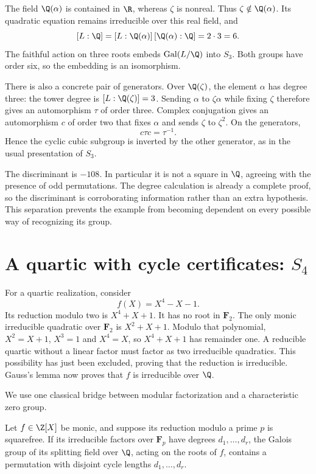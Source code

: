 The field $\Q(\alpha)$ is contained in $\R$, whereas $\zeta$ is nonreal. Thus $\zeta\notin\Q(\alpha)$. Its quadratic equation remains irreducible over this real field, and
\begin{equation}
\label{eq:g02-s3-degree}
[L:\Q]=[L:\Q(\alpha)]\,[\Q(\alpha):\Q]=2\cdot3=6.
\end{equation}
The faithful action on three roots embeds $\Gal(L/\Q)$ into $S_3$. Both groups have order six, so the embedding is an isomorphism.

There is also a concrete pair of generators. Over $\Q(\zeta)$, the element $\alpha$ has degree three: the tower degree is $[L:\Q(\zeta)]=3$. Sending $\alpha$ to $\zeta\alpha$ while fixing $\zeta$ therefore gives an automorphism $\tau$ of order three. Complex conjugation gives an automorphism $c$ of order two that fixes $\alpha$ and sends $\zeta$ to $\zeta^2$. On the generators,
\[
c\tau c=\tau^{-1}.
\]
Hence the cyclic cubic subgroup is inverted by the other generator, as in the usual presentation of $S_3$.

The discriminant is $-108$. In particular it is not a square in $\Q$, agreeing with the presence of odd permutations. The degree calculation is already a complete proof, so the discriminant is corroborating information rather than an extra hypothesis. This separation prevents the example from becoming dependent on every possible way of recognizing its group.

\section{A quartic with cycle certificates: $S_4$}

For a quartic realization, consider
\[
f(X)=X^4-X-1.
\]
Its reduction modulo two is $X^4+X+1$. It has no root in $\mathbf F_2$. The only monic irreducible quadratic over $\mathbf F_2$ is $X^2+X+1$. Modulo that polynomial, $X^2=X+1$, $X^3=1$ and $X^4=X$, so $X^4+X+1$ has remainder one. A reducible quartic without a linear factor must factor as two irreducible quadratics. This possibility has just been excluded, proving that the reduction is irreducible. Gauss's lemma now proves that $f$ is irreducible over $\Q$.

We use one classical bridge between modular factorization and a characteristic zero group.

\begin{theorem}
\label{thm:g02-cycle}
Let $f\in\Z[X]$ be monic, and suppose its reduction modulo a prime $p$ is squarefree. If its irreducible factors over $\mathbf F_p$ have degrees $d_1,\ldots,d_r$, the Galois group of its splitting field over $\Q$, acting on the roots of $f$, contains a permutation with disjoint cycle lengths $d_1,\ldots,d_r$.
\end{theorem}

